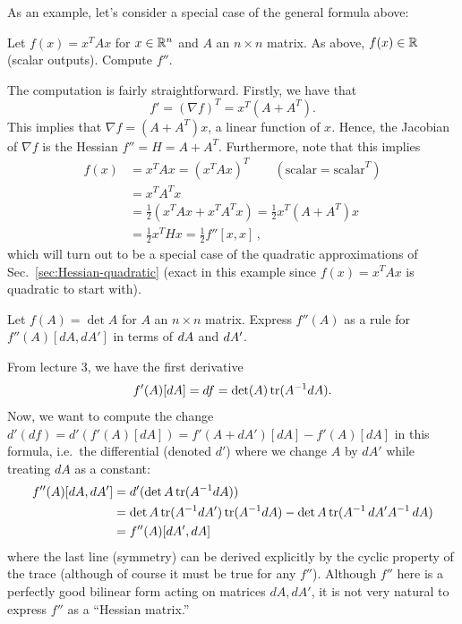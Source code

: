 As an example, let's consider a special case of the general formula above:

\begin{example}
    Let $f(x) = x^T A x$ for $x \in \mathbb R^n$ and $A$ an $n \times n$ matrix. As above, $f(x) \in \mathbb R$ (scalar outputs). Compute $f''$.
\end{example}

The computation is fairly straightforward. Firstly, we have that 
\[
f' = (\nabla f)^T = x^T(A + A^T).
\]
This implies that $\nabla f = (A + A^T) x$, a linear function of $x$. Hence, the Jacobian of $\nabla f$ is the Hessian
$f'' = H = A + A^T$. Furthermore, note that this implies 
\begin{align*}
    f(x) &= x^T A x = (x^T A x)^T  \qquad (\mathrm{scalar} = \mathrm{scalar}^T)\\
    &= x^T A^T x \\
    &= \frac{1}{2} (x^T A x + x^T A^T x) = \frac{1}{2} x^T (A + A^T) x\\
    &= \frac{1}{2} x^T H x = \frac{1}{2} f''[x,x] \, ,
\end{align*}
which will turn out to be a special case of the quadratic approximations of Sec.~\ref{sec:Hessian-quadratic} (exact in this example since $f(x)=x^T A x$ is quadratic to start with).

\begin{example}
    Let $f(A) = \det A$ for $A$ an $n\times n$ matrix. Express $f''(A)$ as a rule for $f''(A)[dA,dA']$ in terms of $d A$ and $d A'$.
\end{example}

From lecture 3, we have the first derivative 
\[
f'(A) [d A] = d f = \det (A) \operatorname{tr}(A^{-1} d A).
\]
Now, we want to compute the change $d'(df) = d'(f'(A)[dA]) = f'(A+dA')[dA] - f'(A)[dA]$ in this formula, i.e.~the differential (denoted $d'$) where we change $A$ by $dA'$ while treating $dA$ as a constant:
\begin{align*}
    f''(A) [d A, d A'] &= d ' (\det A \operatorname{tr} (A^{-1} d A)) \\
    &= \det A \operatorname{tr}(A^{-1} d A') \operatorname{tr}(A^{-1} d A) - \det A \operatorname{tr}(A^{-1} \,d A' A^{-1}\, d A) \\
    &= f''(A) [d A', d A]
\end{align*}
where the last line (symmetry) can be derived
explicitly by the cyclic property of the trace (although of course it must be true for any $f''$).  Although $f''$ here is a perfectly good bilinear form acting on matrices $dA,dA'$, it is not very natural to express $f''$ as a ``Hessian matrix.''


